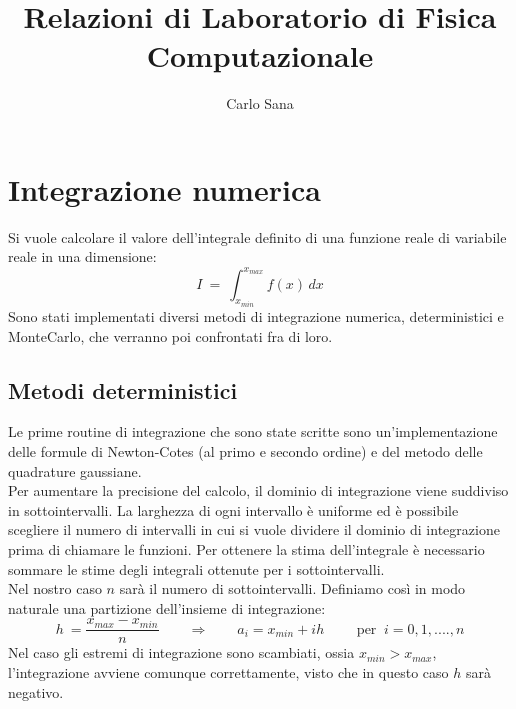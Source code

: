 
\title{Relazioni di Laboratorio di Fisica Computazionale}
\author{Carlo Sana}

\maketitle
\tableofcontents
\chapter{Integrazione numerica}
Si vuole calcolare il valore dell'integrale definito di una funzione reale di variabile reale in una dimensione:
$$
 	I \ = \ \int_{x_{min}}^{x_{max}} f(x) \, dx
$$
Sono stati implementati diversi metodi di integrazione numerica, deterministici e MonteCarlo, che verranno poi confrontati fra di loro.
\section{Metodi deterministici}
Le prime routine di integrazione che sono state scritte sono un'implementazione delle formule di Newton-Cotes (al primo e secondo ordine)
e del metodo delle quadrature gaussiane.\\
Per aumentare la precisione del calcolo, il dominio di integrazione viene suddiviso in sottointervalli.
La larghezza di ogni intervallo è uniforme ed è possibile scegliere il numero di intervalli in cui
si vuole dividere il dominio di integrazione prima di chiamare le funzioni.
Per ottenere la stima dell'integrale è necessario sommare le stime degli integrali ottenute per i sottointervalli.\\
Nel nostro caso $n$ sarà il numero di sottointervalli. Definiamo così in modo naturale una partizione dell'insieme di integrazione:
$$
	h \ = \frac{x_{max} - x_{min}}{ n} \qquad \Longrightarrow \qquad a_i = x_{min} + i h  \qquad
	\mbox{ per } \ i = 0,1,....,n 
$$
Nel caso gli estremi di integrazione sono scambiati, ossia $x_{min} > x_{max}$, l'integrazione avviene comunque correttamente,
visto che in questo caso $h$ sarà negativo.
